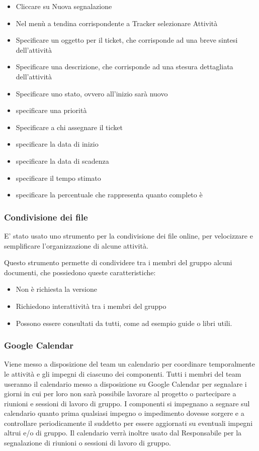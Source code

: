 \begin{itemize}
\item Cliccare su Nuova segnalazione
\item Nel menù a tendina corrispondente a Tracker selezionare Attività
\item Specificare un oggetto per il ticket, che corrisponde ad una breve sintesi dell'attività
\item Specificare una descrizione, che corrisponde ad una stesura dettagliata dell'attività
\item Specificare uno stato, ovvero all'inizio sarà nuovo
\item specificare una priorità
\item Specificare a chi assegnare il ticket
\item specificare la data di inizio
\item specificare la data di scadenza
\item specificare il tempo stimato
\item specificare la percentuale che rappresenta quanto completo è
\end{itemize}


\subsubsection{Condivisione dei file}
E' stato usato uno strumento per la condivisione dei file online, per velocizzare e semplificare l'organizzazione di alcune attività.

Questo strumento permette di condividere tra i membri del gruppo alcuni documenti, che possiedono queste caratteristiche:
\begin{itemize}
\item Non è richiesta la versione
\item Richiedono interattività tra i membri del gruppo
\item Possono essere consultati da tutti, come ad esempio guide o libri utili.
\end{itemize}

\subsubsection{Google Calendar}
\label{4.2}
Viene messo a disposizione del team un calendario per coordinare temporalmente le attività e gli impegni di ciascuno dei componenti.
Tutti i membri del team useranno il calendario messo a disposizione su Google Calendar per segnalare i giorni in cui per loro non sarà possibile lavorare al progetto o partecipare a riunioni e sessioni di lavoro di gruppo. I componenti si impegnano a segnare sul calendario quanto prima qualsiasi impegno o impedimento dovesse sorgere e a controllare periodicamente il suddetto per essere aggiornati su eventuali impegni altrui e/o di gruppo.
Il calendario verrà inoltre usato dal Responsabile per la segnalazione di riunioni o sessioni di lavoro di gruppo.

